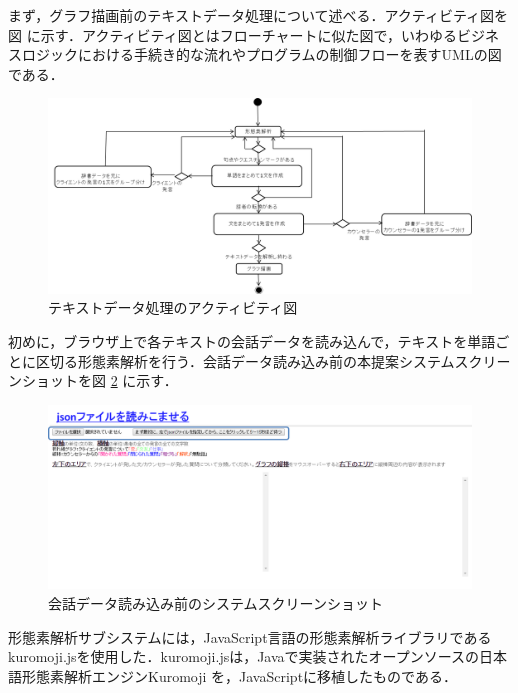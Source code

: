 \documentclass[shuuron]{kuee}
\begin{document}
まず，グラフ描画前のテキストデータ処理について述べる．アクティビティ図を図
に示す．アクティビティ図とはフローチャートに似た図で，いわゆるビジネスロジックにおける手続き的な流れやプログラムの制御フローを表すUMLの図である．
\begin{figure}
  \begin{center}
    \includegraphics[width=\linewidth]{activity.png}
  \end{center}
  \caption{テキストデータ処理のアクティビティ図}
  \label{fig:activity}
\end{figure}


初めに，ブラウザ上で各テキストの会話データを読み込んで，テキストを単語ごとに区切る形態素解析を行う．会話データ読み込み前の本提案システムスクリーンショットを図
\ref{fig:yomikomimae2}
に示す．
\begin{figure}
  \begin{center}
    \includegraphics[width=\linewidth]{yomikomimae2.png}
  \end{center}
  \caption{会話データ読み込み前のシステムスクリーンショット}
  \label{fig:yomikomimae2}
\end{figure}
形態素解析サブシステムには，JavaScript言語の形態素解析ライブラリであるkuromoji.js\cite{kuromojijs}を使用した．kuromoji.jsは，Javaで実装されたオープンソースの日本語形態素解析エンジンKuromoji
を，JavaScriptに移植したものである．
\end{document}
